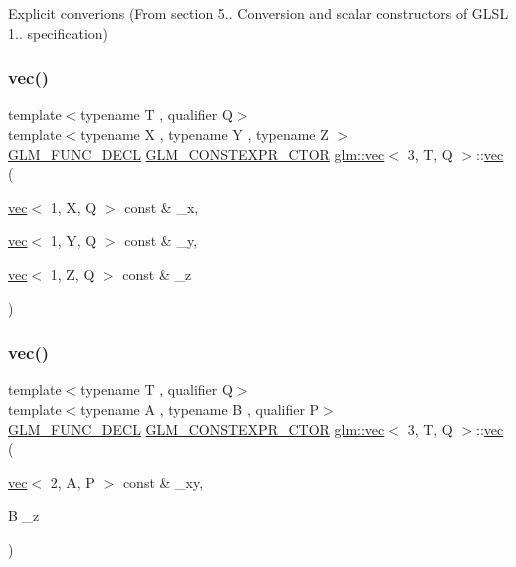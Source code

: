 Explicit converions (From section 5.. Conversion and scalar constructors of G\+L\+SL 1.. specification) 

\mbox{\label{structglm_1_1vec_3_013_00_01_t_00_01_q_01_4_a9aa0a92a8278c84bf0fd3090cbc414d6}} 
\subsubsection{\texorpdfstring{vec()}{vec()}\hspace{0.1cm}{\footnotesize\ttfamily [7/23]}}
{\footnotesize\ttfamily template$<$typename T , qualifier Q$>$ \\
template$<$typename X , typename Y , typename Z $>$ \\
\hyperlink{setup_8hpp_ab2d052de21a70539923e9bcbf6e83a51}{G\+L\+M\+\_\+\+F\+U\+N\+C\+\_\+\+D\+E\+CL} \hyperlink{setup_8hpp_ad34178a09666081abdb573c14d1f4a5a}{G\+L\+M\+\_\+\+C\+O\+N\+S\+T\+E\+X\+P\+R\+\_\+\+C\+T\+OR} \hyperlink{structglm_1_1vec}{glm\+::vec}$<$ 3, T, Q $>$\+::\hyperlink{structglm_1_1vec}{vec} (\begin{DoxyParamCaption}\item[{\hyperlink{structglm_1_1vec}{vec}$<$ 1, X, Q $>$ const \&}]{\+\_\+x,  }\item[{\hyperlink{structglm_1_1vec}{vec}$<$ 1, Y, Q $>$ const \&}]{\+\_\+y,  }\item[{\hyperlink{structglm_1_1vec}{vec}$<$ 1, Z, Q $>$ const \&}]{\+\_\+z }\end{DoxyParamCaption})}

\mbox{\label{structglm_1_1vec_3_013_00_01_t_00_01_q_01_4_a7c657ca44f6029476baa5ad38c8e6220}} 
\subsubsection{\texorpdfstring{vec()}{vec()}\hspace{0.1cm}{\footnotesize\ttfamily [8/23]}}
{\footnotesize\ttfamily template$<$typename T , qualifier Q$>$ \\
template$<$typename A , typename B , qualifier P$>$ \\
\hyperlink{setup_8hpp_ab2d052de21a70539923e9bcbf6e83a51}{G\+L\+M\+\_\+\+F\+U\+N\+C\+\_\+\+D\+E\+CL} \hyperlink{setup_8hpp_ad34178a09666081abdb573c14d1f4a5a}{G\+L\+M\+\_\+\+C\+O\+N\+S\+T\+E\+X\+P\+R\+\_\+\+C\+T\+OR} \hyperlink{structglm_1_1vec}{glm\+::vec}$<$ 3, T, Q $>$\+::\hyperlink{structglm_1_1vec}{vec} (\begin{DoxyParamCaption}\item[{\hyperlink{structglm_1_1vec}{vec}$<$ 2, A, P $>$ const \&}]{\+\_\+xy,  }\item[{B}]{\+\_\+z }\end{DoxyParamCaption})}




